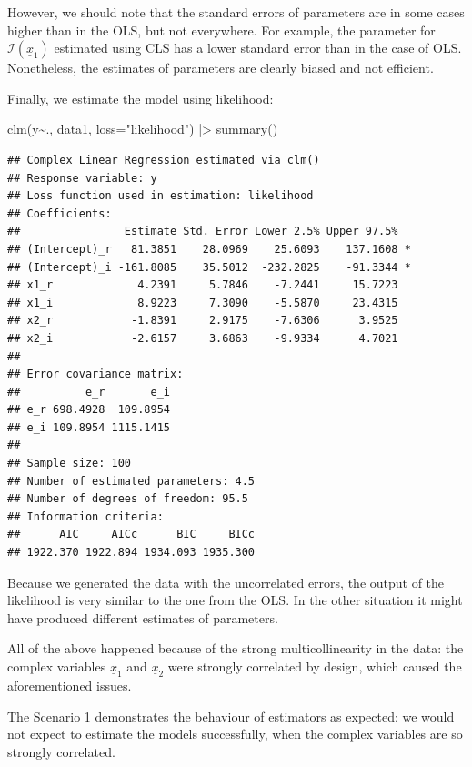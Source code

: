 \documentclass[
]{book}
\newenvironment{Shaded}{\begin{snugshade}}{\end{snugshade}}
\newcommand{\AttributeTok}[1]{\textcolor[rgb]{0.77,0.63,0.00}{#1}}
\newcommand{\FunctionTok}[1]{\textcolor[rgb]{0.00,0.00,0.00}{#1}}
\newcommand{\NormalTok}[1]{#1}
\newcommand{\SpecialCharTok}[1]{\textcolor[rgb]{0.00,0.00,0.00}{#1}}
\newcommand{\StringTok}[1]{\textcolor[rgb]{0.31,0.60,0.02}{#1}}
\begin{document}
However, we should note that the standard errors of parameters are in some cases higher than in the OLS, but not everywhere. For example, the parameter for \(\mathcal{I}\left(\underline{x}_{1}\right)\) estimated using CLS has a lower standard error than in the case of OLS. Nonetheless, the estimates of parameters are clearly biased and not efficient.

Finally, we estimate the model using likelihood:

\begin{Shaded}
\begin{Highlighting}[]
\FunctionTok{clm}\NormalTok{(y}\SpecialCharTok{\textasciitilde{}}\NormalTok{., data1, }\AttributeTok{loss=}\StringTok{"likelihood"}\NormalTok{) }\SpecialCharTok{|\textgreater{}}
    \FunctionTok{summary}\NormalTok{()}
\end{Highlighting}
\end{Shaded}

\begin{verbatim}
## Complex Linear Regression estimated via clm()
## Response variable: y
## Loss function used in estimation: likelihood
## Coefficients:
##                Estimate Std. Error Lower 2.5% Upper 97.5%  
## (Intercept)_r   81.3851    28.0969    25.6093    137.1608 *
## (Intercept)_i -161.8085    35.5012  -232.2825    -91.3344 *
## x1_r             4.2391     5.7846    -7.2441     15.7223  
## x1_i             8.9223     7.3090    -5.5870     23.4315  
## x2_r            -1.8391     2.9175    -7.6306      3.9525  
## x2_i            -2.6157     3.6863    -9.9334      4.7021  
## 
## Error covariance matrix:
##          e_r       e_i
## e_r 698.4928  109.8954
## e_i 109.8954 1115.1415
## 
## Sample size: 100
## Number of estimated parameters: 4.5
## Number of degrees of freedom: 95.5
## Information criteria:
##      AIC     AICc      BIC     BICc 
## 1922.370 1922.894 1934.093 1935.300
\end{verbatim}

Because we generated the data with the uncorrelated errors, the output of the likelihood is very similar to the one from the OLS. In the other situation it might have produced different estimates of parameters.

All of the above happened because of the strong multicollinearity in the data: the complex variables \(\underline{x}_{1}\) and \(\underline{x}_{2}\) were strongly correlated by design, which caused the aforementioned issues.

The Scenario 1 demonstrates the behaviour of estimators as expected: we would not expect to estimate the models successfully, when the complex variables are so strongly correlated.
\end{document}
